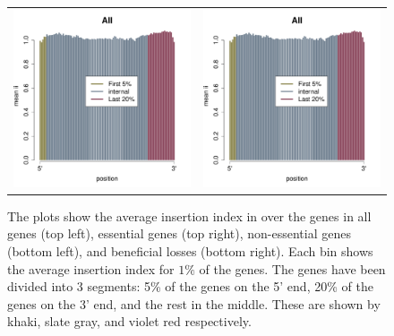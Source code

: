 \documentclass[12pt,letterpaper]{article}
\begin{document}
\begin{figure}
\begin{tabular}{c c}
\includegraphics[scale=0.4, page=3]{insertion-position-bias.pdf}&
\includegraphics[scale=0.4, page=4]{insertion-position-bias.pdf}
\end{tabular}
\caption{The plots show the average insertion index in over the genes in all genes (top left), essential genes (top right), non-essential genes (bottom left), and beneficial losses (bottom right). Each bin shows the average insertion index for $1\%$ of the genes. The genes have been divided into 3 segments: 5\% of
the genes on the 5' end, 20\% of the genes on the 3' end, and the rest in the middle. These are shown by khaki, slate gray, and violet red respectively.}
\label{fig:insertion-position-bias}
\end{figure}
\end{document}
